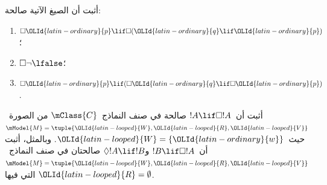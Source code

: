 \documentclass[../../../include/open-logic-section]{subfiles}
\begin{document}
\begin{prob}
  أثبت أن الصيغ الآتية صالحة:
  \begin{enumerate}
  \item $\Box \OLId{latin-ordinary}{p} \lif \Box (\OLId{latin-ordinary}{q} \lif \OLId{latin-ordinary}{p})$؛
  \item $\Box \lnot \lfalse$؛
  \item $\Box \OLId{latin-ordinary}{p} \lif (\Box \OLId{latin-ordinary}{q} \lif \Box \OLId{latin-ordinary}{p})$.
  \end{enumerate}
\end{prob}

\begin{prob}
  أثبت أن~$!A \lif \Box!A$ صالحة في صنف النماذج~$\mClass{C}$ من
  الصورة~$\mModel{M} = \tuple{\OLId{latin-looped}{W}, \OLId{latin-looped}{R}, \OLId{latin-looped}{V}}$ حيث~$\OLId{latin-looped}{W} = \{\OLId{latin-ordinary}{w}\}$. وبالمثل،
  أثبت أن~$!B \lif \Box !A$ و$\Diamond !A \lif !B$ صالحتان في صنف
  النماذج~$\mModel{M} = \tuple{\OLId{latin-looped}{W}, \OLId{latin-looped}{R}, \OLId{latin-looped}{V}}$ التي فيها
  $\OLId{latin-looped}{R} = \emptyset$.
\end{prob}
\end{document}
